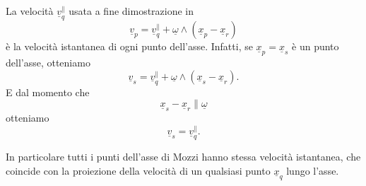 \begin{oss}{}
La velocità $\underline{v}_{q}^{\parallel}$ usata a fine dimostrazione in
\[
\underline{v}_{p}=\underline{v}_{q}^{\parallel}+\underline{\omega}\wedge\left(\underline{x}_{p}-\underline{x}_{r}\right)
\]
è la velocità istantanea di ogni punto dell'asse. Infatti, se $\underline{x}_{p}=\underline{x}_{s}$ è un punto dell'asse, otteniamo
\[
\underline{v}_{s}=\underline{v}_{q}^{\parallel}+\underline{\omega}\wedge\left(\underline{x}_{s}-\underline{x}_{r}\right).
\]
E dal momento che
\[
\underline{x}_{s}-\underline{x}_{r}\parallel \underline{\omega}
\]
otteniamo
\[
\underline{v}_{s}=\underline{v}_{q}^{\parallel}.
\]

In particolare tutti i punti dell'asse di Mozzi hanno stessa velocità istantanea, che coincide con la proiezione della velocità di un qualsiasi punto $\underline{x}_{q}$ lungo l'asse.

\end{oss}
